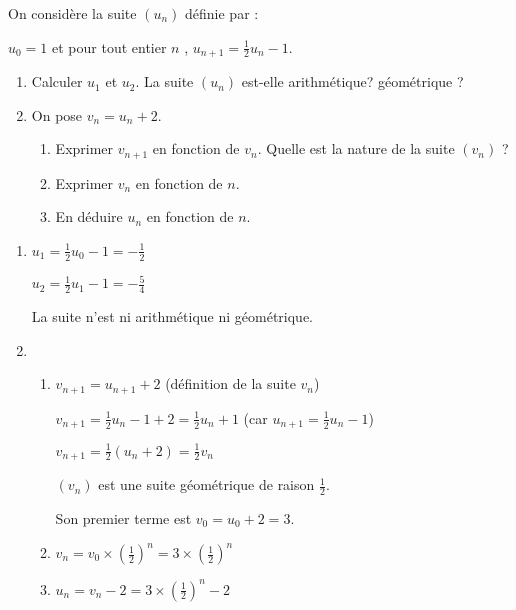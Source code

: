 
%
On considère la suite $\left(u_{n}\right)$ définie par :
\par
$u_{0}=1$ et pour tout entier $n$ , $u_{n+1}= \frac{1}{2} u_{n}-1$.
\begin{enumerate}
     \item
     Calculer $u_{1}$ et $u_{2}$. La suite $\left(u_{n}\right)$ est-elle arithmétique? géométrique ?
     \item
     On pose $v_{n}=u_{n}+2$.
     \begin{enumerate}[label=\alph*.]
          \item
          Exprimer $v_{n+1}$ en fonction de $v_{n}$. Quelle est la nature de la suite $\left(v_{n}\right)$ ?
          \item
          Exprimer $v_{n}$ en fonction de $n$.
          \item
          En déduire $u_{n}$ en fonction de $n$.
     \end{enumerate}
\end{enumerate}
\begin{corrige}
     \begin{enumerate}
          \item
          $u_{1}=\frac{1}{2}u_{0}-1=-\frac{1}{2}$
          \par
          $u_{2}=\frac{1}{2}u_{1}-1=-\frac{5}{4}$
          \par
          La suite n'est ni arithmétique ni géométrique.
   
     \item
     \begin{enumerate}
          \item
          $v_{n+1}=u_{n+1}+2  $  (définition de la suite $v_{n}$)
          \par
          $v_{n+1}=\frac{1}{2}u_{n}-1+2=\frac{1}{2}u_{n}+1   $ (car $u_{n+1}= \frac{1}{2} u_{n}-1$)
          \par
          $v_{n+1}=\frac{1}{2}\left(u_{n}+2\right)=\frac{1}{2}v_{n}$
          \par
          $\left(v_{n}\right)$ est une suite géométrique de raison $\frac{1}{2}$.
          \par
          Son premier terme est $v_{0}=u_{0}+2=3$.
          \item
          $v_{n}=v_{0}\times \left(\frac{1}{2}\right)^{n}=3\times \left(\frac{1}{2}\right)^{n}$
          \item
          $u_{n}=v_{n}-2=3\times \left(\frac{1}{2}\right)^{n}-2$
     \end{enumerate}
\end{enumerate}
\end{corrige}

